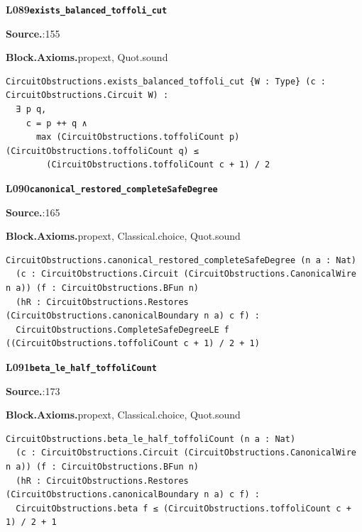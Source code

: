 \par\medskip\noindent\begin{minipage}{\textwidth}
{\small\bfseries L089\enspace\texttt{exists\_balanced\_toffoli\_cut}\par}
{\footnotesize\raggedright\textbf{Source.}\enspace{}:155\par
\textbf{Block.}\quad\textbf{Axioms.}\enspace propext, Quot.sound\par}\nopagebreak
\begin{lstlisting}
CircuitObstructions.exists_balanced_toffoli_cut {W : Type} (c : CircuitObstructions.Circuit W) :
  ∃ p q,
    c = p ++ q ∧
      max (CircuitObstructions.toffoliCount p) (CircuitObstructions.toffoliCount q) ≤
        (CircuitObstructions.toffoliCount c + 1) / 2
\end{lstlisting}
\end{minipage}\par

\par\medskip\noindent\begin{minipage}{\textwidth}
{\small\bfseries L090\enspace\texttt{canonical\_restored\_completeSafeDegree}\par}
{\footnotesize\raggedright\textbf{Source.}\enspace{}:165\par
\textbf{Block.}\quad\textbf{Axioms.}\enspace propext, Classical.choice, Quot.sound\par}\nopagebreak
\begin{lstlisting}
CircuitObstructions.canonical_restored_completeSafeDegree (n a : Nat)
  (c : CircuitObstructions.Circuit (CircuitObstructions.CanonicalWire n a)) (f : CircuitObstructions.BFun n)
  (hR : CircuitObstructions.Restores (CircuitObstructions.canonicalBoundary n a) c f) :
  CircuitObstructions.CompleteSafeDegreeLE f ((CircuitObstructions.toffoliCount c + 1) / 2 + 1)
\end{lstlisting}
\end{minipage}\par

\par\medskip\noindent\begin{minipage}{\textwidth}
{\small\bfseries L091\enspace\texttt{beta\_le\_half\_toffoliCount}\par}
{\footnotesize\raggedright\textbf{Source.}\enspace{}:173\par
\textbf{Block.}\quad\textbf{Axioms.}\enspace propext, Classical.choice, Quot.sound\par}\nopagebreak
\begin{lstlisting}
CircuitObstructions.beta_le_half_toffoliCount (n a : Nat)
  (c : CircuitObstructions.Circuit (CircuitObstructions.CanonicalWire n a)) (f : CircuitObstructions.BFun n)
  (hR : CircuitObstructions.Restores (CircuitObstructions.canonicalBoundary n a) c f) :
  CircuitObstructions.beta f ≤ (CircuitObstructions.toffoliCount c + 1) / 2 + 1
\end{lstlisting}
\end{minipage}\par

